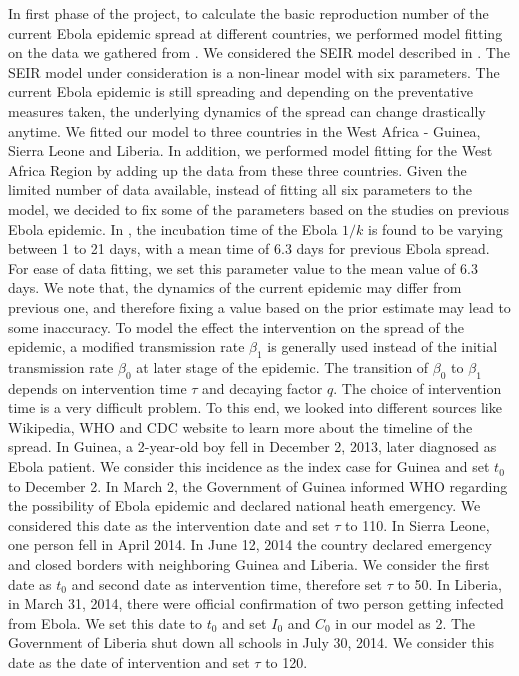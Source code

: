 \documentclass[10pt, journal,onecolumn]{IEEEtran}
\begin{document}
In first phase of the project, to calculate the basic reproduction number of the current Ebola epidemic spread at different countries, we performed model fitting on the data we gathered from \cite{cmriversdata}. We considered the SEIR model described in \cite{chowell2004basic}. The SEIR model under consideration is a non-linear model with six parameters. The current Ebola epidemic is still spreading and depending on the preventative measures  taken, the underlying dynamics of the spread can change drastically anytime. We fitted our model to three countries in the West Africa - Guinea, Sierra Leone and Liberia. In addition, we performed model fitting for the West Africa Region by adding up the data from these three countries. Given the limited number of data available, instead of fitting all six parameters to the model, we decided to fix some of the parameters based on the studies on previous Ebola epidemic. In \cite{chowell2004basic}, the incubation time of the Ebola $1/k$ is found to be varying between 1 to 21 days, with a mean time of 6.3 days for previous Ebola spread. For ease of data fitting, we set this parameter value to the mean value of 6.3 days. We note that, the dynamics of the current epidemic may differ from previous one, and therefore fixing a value based on the prior estimate may lead to some inaccuracy. To model the effect the intervention on the spread of the epidemic, a modified transmission rate $\beta_1$ is generally used instead of the initial transmission rate $\beta_0$ at later stage of the epidemic. The transition of $\beta_0$ to $\beta_1$ depends on intervention time $\tau$ and decaying factor $q$. The choice of intervention time is a very difficult problem. To this end, we looked into different sources like Wikipedia, WHO and CDC website to learn more about the timeline of the spread. In Guinea, a 2-year-old boy fell in December 2, 2013, later diagnosed as Ebola patient. We consider this incidence as the index case for Guinea and set $t_0$ to December 2. In March 2, the Government of Guinea informed WHO regarding the possibility of Ebola epidemic and declared national heath emergency. We considered this date as the intervention date and set $\tau$ to 110. In Sierra Leone, one person fell in April 2014. In June 12, 2014 the country declared emergency and closed borders with neighboring Guinea and Liberia. We consider the first date as $t_0$ and second date as intervention time, therefore set $\tau$ to 50. In Liberia, in March 31, 2014, there were official confirmation of two person getting infected from Ebola. We set this date to $t_0$ and set $I_0$ and $C_0$ in our model as 2. The Government of Liberia shut down all schools in July 30, 2014. We consider this date as the date of intervention and set $\tau$ to 120.
\end{document}
